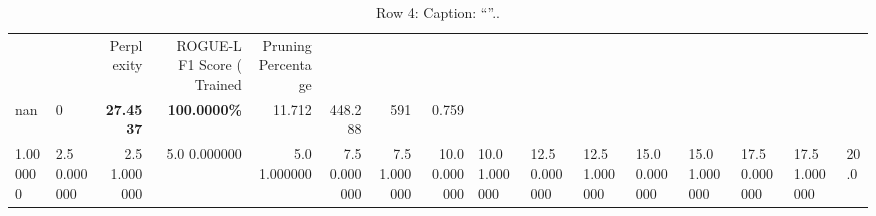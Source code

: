 \begin{table}
\caption{Row 4\ifshowcaption{}: Caption: ``''.\else.\fi}
\label{tab:evaluation-pipeline-4}
\begin{tabular}{llrrrrrr}
 &  & Perplexity & ROGUE-L F1 Score (%
Trained & Pruning Percentage &  &  &  &  &  &  \\
nan & 0 & \bfseries 27.4537 & \bfseries 100.0000\% & 11.712 & 448.288 & 591 & 0.759 \\
1.000000 & 2.5%
0.000000 & 2.5%
1.000000 & 5.0%
0.000000 & 5.0%
1.000000 & 7.5%
0.000000 & 7.5%
1.000000 & 10.0%
0.000000 & 10.0%
1.000000 & 12.5%
0.000000 & 12.5%
1.000000 & 15.0%
0.000000 & 15.0%
1.000000 & 17.5%
0.000000 & 17.5%
1.000000 & 20.0%

\end{tabular}
\end{table}
